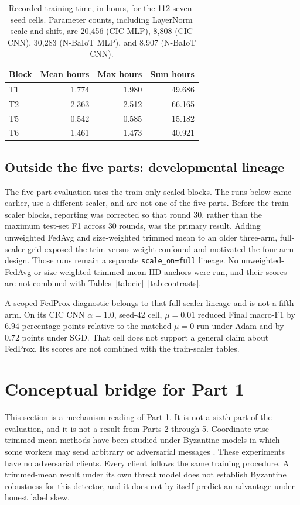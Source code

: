 \documentclass{ieeeaccess}
\begin{document}
\begin{table}[!t]
\centering
\caption{Recorded training time, in hours, for the 112 seven-seed cells. Parameter counts, including LayerNorm scale and shift, are 20,456 (CIC MLP), 8,808 (CIC CNN), 30,283 (N-BaIoT MLP), and 8,907 (N-BaIoT CNN).}
\label{tab:cost}
\small
\begin{tabular}{lrrr}
\hline
Block & Mean hours & Max hours & Sum hours \\
\hline
T1 & 1.774 & 1.980 & 49.686 \\
T2 & 2.363 & 2.512 & 66.165 \\
T5 & 0.542 & 0.585 & 15.182 \\
T6 & 1.461 & 1.473 & 40.921 \\
\hline
\end{tabular}
\end{table}

\subsection{Outside the five parts: developmental lineage}
The five-part evaluation uses the train-only-scaled blocks. The runs below came earlier, use a different scaler, and are not one of the five parts. Before the train-scaler blocks, reporting was corrected so that round 30, rather than the maximum test-set F1 across 30 rounds, was the primary result. Adding unweighted FedAvg and size-weighted trimmed mean to an older three-arm, full-scaler grid exposed the trim-versus-weight confound and motivated the four-arm design. Those runs remain a separate \texttt{scale\_on=full} lineage. No unweighted-FedAvg or size-weighted-trimmed-mean IID anchors were run, and their scores are not combined with Tables~\ref{tab:cic}--\ref{tab:contrasts}.

A scoped FedProx diagnostic belongs to that full-scaler lineage and is not a fifth arm. On its CIC CNN $\alpha=1.0$, seed-42 cell, $\mu=0.01$ reduced Final macro-F1 by $6.94$ percentage points relative to the matched $\mu=0$ run under Adam and by $0.72$ points under SGD. That cell does not support a general claim about FedProx. Its scores are not combined with the train-scaler tables.

\section{Conceptual bridge for Part 1}
This section is a mechanism reading of Part 1. It is not a sixth part of the evaluation, and it is not a result from Parts 2 through 5. Coordinate-wise trimmed-mean methods have been studied under Byzantine models in which some workers may send arbitrary or adversarial messages \cite{yin18}. These experiments have no adversarial clients. Every client follows the same training procedure. A trimmed-mean result under its own threat model does not establish Byzantine robustness for this detector, and it does not by itself predict an advantage under honest label skew.
\end{document}
